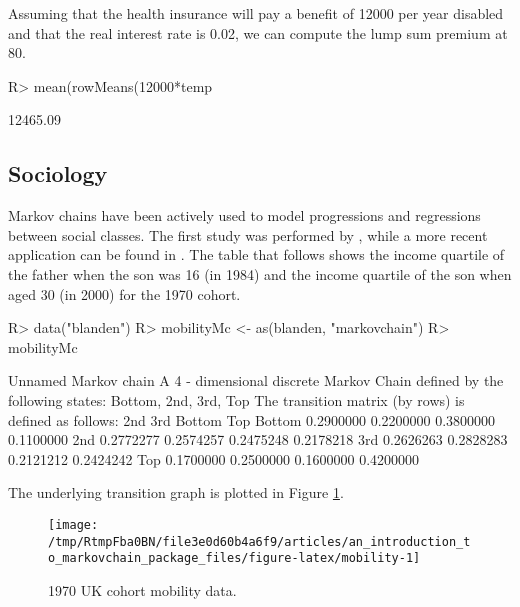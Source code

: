 \documentclass[
  nojss]{jss}
\begin{document}
Assuming that the health insurance will pay a benefit of 12000 per year disabled and that the real interest rate is 0.02, we can compute the lump sum premium at 80.

\begin{CodeChunk}

\begin{CodeInput}
R> mean(rowMeans(12000*temp%
\end{CodeInput}

\begin{CodeOutput}
[1] 12465.09
\end{CodeOutput}
\end{CodeChunk}

\hypertarget{app:sociology}{%
\subsection{Sociology}\label{app:sociology}}

Markov chains have been actively used to model progressions and regressions between social classes. The first study was performed by \cite{glassHall}, while a more recent application can be found in \cite{blandenEtAlii}. The table that follows shows the income quartile of the father when the son was 16 (in 1984) and the income quartile of the son when aged 30 (in 2000) for the 1970 cohort.

\begin{CodeChunk}

\begin{CodeInput}
R> data("blanden")
R> mobilityMc <- as(blanden, "markovchain")
R> mobilityMc
\end{CodeInput}

\begin{CodeOutput}
Unnamed Markov chain 
 A  4 - dimensional discrete Markov Chain defined by the following states: 
 Bottom, 2nd, 3rd, Top 
 The transition matrix  (by rows)  is defined as follows: 
             2nd       3rd    Bottom       Top
Bottom 0.2900000 0.2200000 0.3800000 0.1100000
2nd    0.2772277 0.2574257 0.2475248 0.2178218
3rd    0.2626263 0.2828283 0.2121212 0.2424242
Top    0.1700000 0.2500000 0.1600000 0.4200000
\end{CodeOutput}
\end{CodeChunk}

The underlying transition graph is plotted in Figure \ref{fig:mobility}.

\begin{CodeChunk}
\begin{figure}

{\centering \texttt{[image: /tmp/RtmpFba0BN/file3e0d60b4a6f9/articles/an\_introduction\_to\_markovchain\_package\_files/figure-latex/mobility-1]} 

}

\caption[1970 UK cohort mobility data]{1970 UK cohort mobility data.}\label{fig:mobility}
\end{figure}
\end{CodeChunk}
\end{document}
